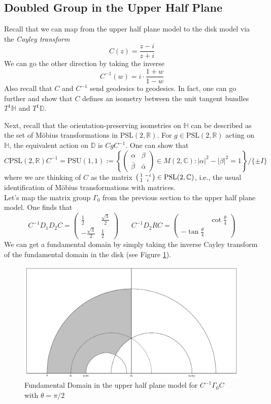 \documentclass[]{article}
\begin{document}
\subsection*{Doubled Group in the Upper Half Plane}

Recall that we can map from the upper half plane model to the disk model via the \textit{Cayley transform}
$$
C(z) = \frac{z - i}{z + i}
$$
We can go the other direction by taking the inverse
$$
C^{-1}(w) = i\cdot\frac{1 + w}{1 - w}
$$
Also recall that $C$ and $C^{-1}$ send geodesics to geodesics.
In fact, one can go further and show that $C$ defines an isometry between the unit tangent bundles $T^1\mathbb{H}$ and $T^1\mathbb{D}$.

Next, recall that the orientation-preserving isometries on $\mathbb{H}$ can be described as the set of M\"obius transformations in $\text{PSL}(2, \mathbb{R})$.
For $g \in \text{PSL}(2, \mathbb{R})$ acting on $\mathbb{H}$, the equivalent action on $\mathbb{D}$ is $CgC^{-1}$.
One can show that
$$
C\text{PSL}(2, \mathbb{R})C^{-1} = \text{PSU}(1, 1) :=
\left\{ 
\begin{pmatrix}
\alpha & \beta \\
\bar{\beta} & \bar{\alpha}
\end{pmatrix} \in M(2, \mathbb{C}) : |\alpha|^2 - |\beta|^2 = 1
\right\} / \{\pm I\}
$$
where we are thinking of $C$ as the matrix $\begin{psmallmatrix} 1 & -i \\ 1 & i \end{psmallmatrix} \in \text{PSL}(2, \mathbb{C})$, i.e., the usual identification of M\"obius transformations with matrices.
\\

Let's map the matrix group $\Gamma_0$ from the previous section to the upper half plane model.
One finds that
$$
C^{-1}D_1D_2C =
\begin{pmatrix}
\frac{1}{2} & \frac{\sqrt{3}}{2} \\
-\frac{\sqrt{3}}{2} & \frac{1}{2}
\end{pmatrix}
~~~~~~~~
C^{-1}D_2RC =
\begin{pmatrix}
~ & \cot\frac{\theta}{4} \\
-\tan\frac{\theta}{4} & ~
\end{pmatrix}
$$
We can get a fundamental domain by simply taking the inverse Cayley transform of the fundamental domain in the disk (see Figure \ref{fd_doubled_UHP}).
\begin{figure}
	\centering
	\includegraphics[width=0.7\linewidth]{doubled_cover_UHP.png}
	\caption{Fundamental Domain in the upper half plane model for $C^{-1}\Gamma_0C$ with $\theta = \pi/2$}
	\label{fd_doubled_UHP}
\end{figure}
\end{document}
